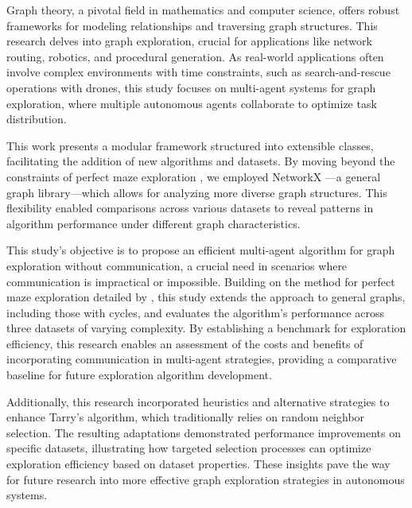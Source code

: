 Graph theory, a pivotal field in mathematics and computer science, offers robust frameworks for modeling relationships and traversing graph structures. This research delves into graph exploration, crucial for applications like network routing, robotics, and procedural generation. As real-world applications often involve complex environments with time constraints, such as search-and-rescue operations with drones, this study focuses on multi-agent systems for graph exploration, where multiple autonomous agents collaborate to optimize task distribution.

This work presents a modular framework structured into extensible classes, facilitating the addition of new algorithms and datasets. By moving beyond the constraints of perfect maze exploration \cite{Naeem2021}, we employed NetworkX \cite{Hagberg2008}—a general graph library—which allows for analyzing more diverse graph structures. This flexibility enabled comparisons across various datasets to reveal patterns in algorithm performance under different graph characteristics.

This study's objective is to propose an efficient multi-agent algorithm for graph exploration without communication, a crucial need in scenarios where communication is impractical or impossible. Building on the method for perfect maze exploration detailed by , this study extends the approach to general graphs, including those with cycles, and evaluates the algorithm's performance across three datasets of varying complexity. By establishing a benchmark for exploration efficiency, this research enables an assessment of the costs and benefits of incorporating communication in multi-agent strategies, providing a comparative baseline for future exploration algorithm development.

Additionally, this research incorporated heuristics and alternative strategies to enhance Tarry's algorithm, which traditionally relies on random neighbor selection. The resulting adaptations demonstrated performance improvements on specific datasets, illustrating how targeted selection processes can optimize exploration efficiency based on dataset properties. These insights pave the way for future research into more effective graph exploration strategies in autonomous systems.